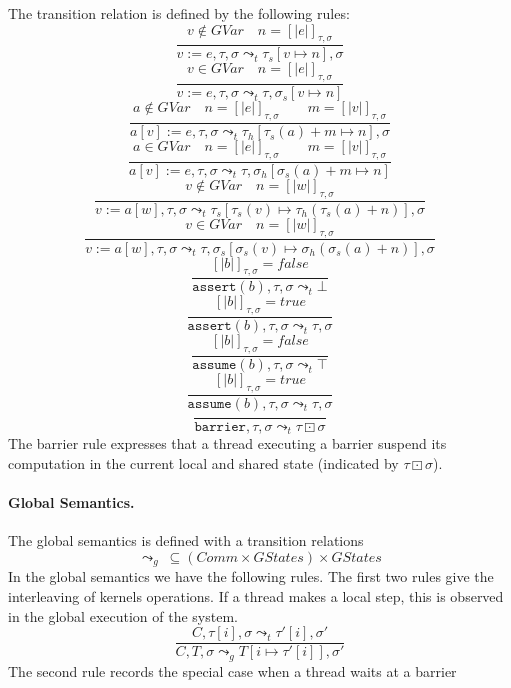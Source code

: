 \documentclass[a4paper,11pt]{llncs}
\newcommand{\wait}{\boxdot}
\newcommand{\gstates}{\mathit{GStates}}
\newcommand{\gvars}{\mathit{GVar}}
\newcommand{\sem}[1]{[ \! | #1 | \! ]}
\begin{document}
The transition relation is defined by the following rules:
\[
\frac{v \notin \gvars \quad n=\sem{e}_{\tau,\sigma}}{v:=e,\tau,\sigma \leadsto_t \tau_s[v \mapsto n],\sigma}
\]
\[
\frac{v \in \gvars \quad n=\sem{e}_{\tau,\sigma}}{v:=e,\tau,\sigma \leadsto_t \tau, \sigma_s[v \mapsto n]}
\]
\[
\frac{a \notin \gvars \quad n=\sem{e}_{\tau,\sigma} \qquad m=\sem{v}_{\tau,\sigma}}{a[v]:=e,\tau,\sigma \leadsto_t \tau_h[\tau_s(a)+m \mapsto n],\sigma}
\]
\[
\frac{a \in \gvars \quad n=\sem{e}_{\tau,\sigma} \qquad m=\sem{v}_{\tau,\sigma}}{a[v]:=e,\tau,\sigma \leadsto_t \tau, \sigma_h[\sigma_s(a)+m \mapsto n]}
\]
\[
\frac{v \notin \gvars \quad n=\sem{w}_{\tau,\sigma} }{v:=a[w],\tau,\sigma \leadsto_t \tau_s[\tau_s(v) \mapsto \tau_h(\tau_s(a)+n)],\sigma}
\]
\[
\frac{v \in \gvars \quad n=\sem{w}_{\tau,\sigma} }{v:=a[w],\tau,\sigma \leadsto_t \tau, \sigma_s[\sigma_s(v) \mapsto \sigma_h(\sigma_s(a)+n)],\sigma}
\]
\[
\frac{\sem{b}_{\tau,\sigma}=false }{\texttt{assert}(b),\tau,\sigma \leadsto_t \bot}
\]
\[
\frac{\sem{b}_{\tau,\sigma}=true }{\texttt{assert}(b),\tau,\sigma \leadsto_t \tau,\sigma}
\]
\[
\frac{\sem{b}_{\tau,\sigma}=false }{\texttt{assume}(b),\tau,\sigma \leadsto_t \top}
\]
\[
\frac{\sem{b}_{\tau,\sigma}=true }{\texttt{assume}(b),\tau,\sigma \leadsto_t \tau,\sigma}
\]
\[
\frac{}{\texttt{barrier},\tau,\sigma \leadsto_t \tau \wait \sigma}
\]
The barrier rule expresses  that a thread executing a barrier suspend its computation in the current local and shared state (indicated by $\tau \wait \sigma$).

\paragraph{Global Semantics.}
The global semantics is defined with a transition relations
\[
 \leadsto_g \ \subseteq (Comm \times \gstates ) \times \gstates
\]
In the global semantics we have the following rules. The first two rules give the interleaving of kernels operations. If a thread makes a local step, this is observed in the global 
execution of the system. 
\[
\frac{C,\tau[i],\sigma \leadsto_t \tau'[i],\sigma'}{C,T,\sigma \leadsto_g T[i \mapsto \tau'[i]],\sigma'}
\]
The second rule records the special case when a thread
waits at a barrier
\end{document}
